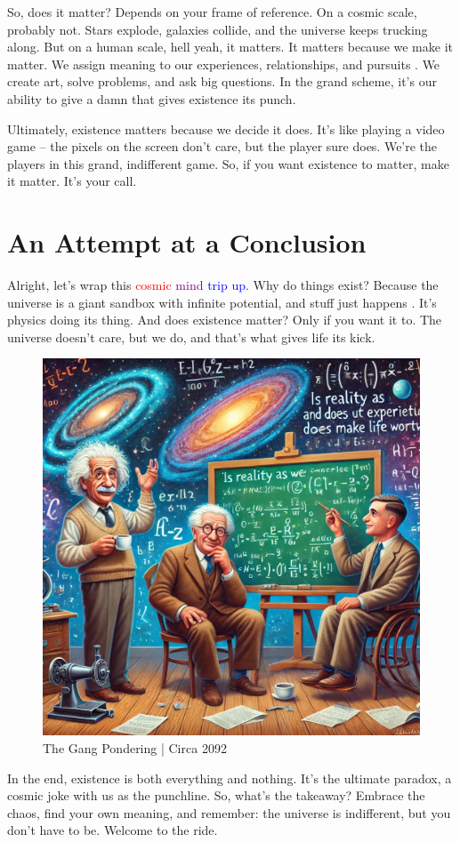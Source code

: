\documentclass{Axon}
\begin{document}
So, does it matter? Depends on your frame of reference. On a cosmic scale, probably not. Stars explode, galaxies collide, and the universe keeps trucking along. But on a human scale, hell yeah, it matters. It matters because we make it matter. We assign meaning to our experiences, relationships, and pursuits \cite{quantumTomfoolery2024}. We create art, solve problems, and ask big questions. In the grand scheme, it's our ability to give a damn that gives existence its punch.

Ultimately, existence matters because we decide it does. It’s like playing a video game – the pixels on the screen don’t care, but the player sure does. We’re the players in this grand, indifferent game. So, if you want existence to matter, make it matter. It's your call.
\section{An Attempt at a Conclusion}
Alright, let's wrap this \textcolor{red}{cosmic} \textcolor{purple}{mind} \textcolor{blue}{trip up}. Why do things exist? Because the universe is a giant sandbox with infinite potential, and stuff just happens \cite{quantumJokes}. It’s physics doing its thing. And does existence matter? Only if you want it to. The universe doesn’t care, but we do, and that’s what gives life its kick.

\begin{figure}[h]
    \centering
    \includegraphics[width=0.35\linewidth]{TheGang.jpeg}
    \caption{The Gang Pondering | Circa 2092}
    \label{fig:The Gang}
\end{figure}

In the end, existence is both everything and nothing. It’s the ultimate paradox, a cosmic joke with us as the punchline. So, what’s the takeaway? Embrace the chaos, find your own meaning, and remember: the universe is indifferent, but you don't have to be. Welcome to the ride.

\printbibliography
\end{document}
